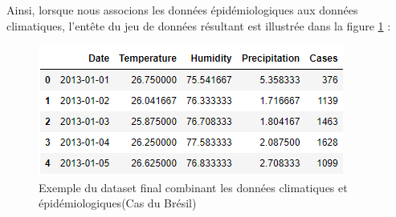 Ainsi, lorsque nous associons les données épidémiologiques aux données climatiques, l'entête du jeu de données résultant est illustrée dans la figure \ref{fig:datasetsample} :
\begin{figure}[h!]
	\centering
	\includegraphics[width=0.8\linewidth]{images/dataset_sample}
	\caption{Exemple du dataset final combinant les données climatiques et épidémiologiques(Cas du Brésil)}
	\label{fig:datasetsample}
\end{figure}

